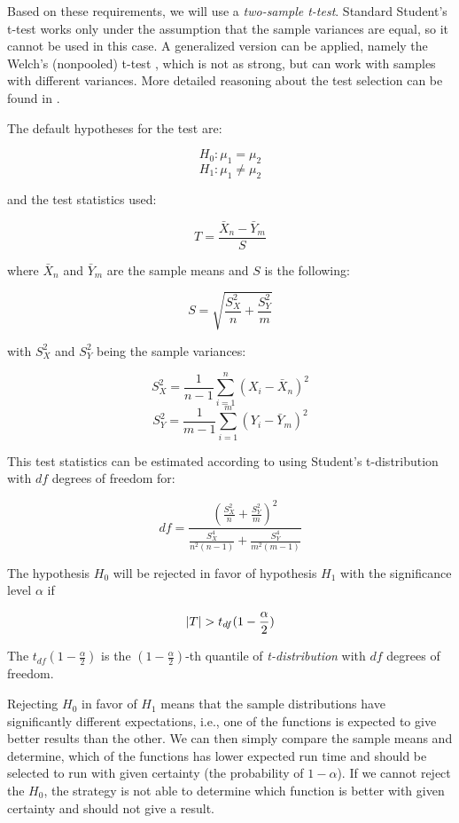 Based on these requirements, we will use a \textit{two-sample t-test}. Standard Student's t-test works only under the assumption that the sample variances are equal, so it cannot be used in this case. A generalized version can be applied, namely the Welch's (nonpooled) t-test \cite{welch_generalisation_1947}, which is not as strong, but can work with samples with different variances. More detailed reasoning about the test selection can be found in \cite{weiss_introductory_2010}.

The default hypotheses for the test are:

\[
H_0: \mu_1 = \mu_2
\]
\[
H_1: \mu_1 \ne  \mu_2
\]

and the test statistics used:

\[
T = \frac{\bar{X}_n - \bar{Y}_m}{S}
\]

where $\bar{X}_n$ and $\bar{Y}_m$ are the sample means and $S$ is the following:

\[
S = \sqrt{\frac{S_X^2}{n} + \frac{S_Y^2}{m}}
\]

with $S_X^2$ and $S_Y^2$ being the sample variances:

\[
S_X^2 = \frac{1}{n-1} \sum_{i=1}^{n}(X_i - \bar{X}_n)^2
\]
\[
S_Y^2 = \frac{1}{m-1} \sum_{i=1}^{m}(Y_i - \bar{Y}_m)^2
\]

This test statistics can be estimated according to \cite{weiss_introductory_2010} using Student's t-distribution with $df$ degrees of freedom for:

\[
df = \frac{(\frac{S_X^2}{n} + \frac{S_Y^2}{m})^2}{\frac{S_X^4}{n^2(n - 1)} + \frac{S_Y^4}{m^2(m - 1)}}
\]

The hypothesis $H_0$ will be rejected in favor of hypothesis $H_1$ with the significance level $\alpha$ if

\[\left|{T}\right| > t_{df}(1-\frac{\alpha}{2})\]

The $t_{df}(1-\frac{\alpha}{2})$ is the $(1-\frac{\alpha}{2})$-th quantile of \textit{t-distribution} with $df$ degrees of freedom.

Rejecting $H_0$ in favor of $H_1$ means that the sample distributions have significantly different expectations, i.e., one of the functions is expected to give better results than the other. We can then simply compare the sample means and determine, which of the functions has lower expected run time and should be selected to run with given certainty (the probability of $1-\alpha$). If we cannot reject the $H_0$, the strategy is not able to determine which function is better with given certainty and should not give a result.

